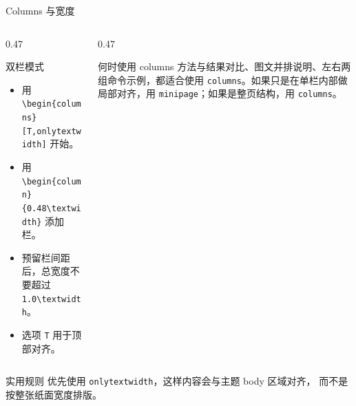\documentclass[aspectratio=169,10pt]{ctexbeamer}
\begin{document}
\begin{academicframe}{Columns 与宽度}
  \begin{columns}[T,onlytextwidth]
    \begin{column}{0.47\textwidth}
      \begin{block}{双栏模式}
        \scriptsize
        \begin{itemize}
          \item 用 \texttt{\textbackslash begin\{columns\}[T,onlytextwidth]} 开始。
          \item 用 \texttt{\textbackslash begin\{column\}\{0.48\textbackslash textwidth\}} 添加栏。
          \item 预留栏间距后，总宽度不要超过 \texttt{1.0\textbackslash textwidth}。
          \item 选项 \texttt{T} 用于顶部对齐。
        \end{itemize}
      \end{block}
    \end{column}
    \begin{column}{0.47\textwidth}
      \begin{exampleblock}{何时使用 columns}
        \scriptsize
        方法与结果对比、图文并排说明、左右两组命令示例，都适合使用
        \texttt{columns}。如果只是在单栏内部做局部对齐，用
        \texttt{minipage}；如果是整页结构，用 \texttt{columns}。
      \end{exampleblock}
    \end{column}
  \end{columns}

  \vspace{0.5em}
  \begin{alertblock}{实用规则}
    \scriptsize
    优先使用 \texttt{onlytextwidth}，这样内容会与主题 body 区域对齐，
    而不是按整张纸面宽度排版。
  \end{alertblock}
\end{academicframe}
\end{document}
